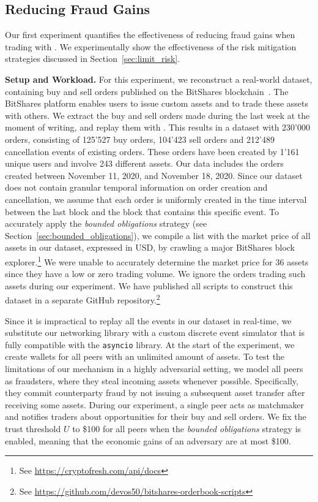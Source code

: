\subsection{Reducing Fraud Gains}
\label{sec:fraud_experiment}
Our first experiment quantifies the effectiveness of reducing fraud gains when trading with \ModelName{}.
We experimentally show the effectiveness of the risk mitigation strategies discussed in Section~\ref{sec:limit_risk}.

\textbf{Setup and Workload.}
For this experiment, we reconstruct a real-world dataset, containing buy and sell orders published on the BitShares blockchain~\cite{schuh2015bitshares}.
The BitShares platform enables users to issue custom assets and to trade these assets with others.
We extract the buy and sell orders made during the last week at the moment of writing, and replay them with \ModelName{}.
This results in a dataset with 230'000 orders, consisting of 125'527 buy orders, 104'423 sell orders and 212'489 cancellation events of existing orders.
These orders have been created by 1'161 unique users and involve 243 different assets.
Our data includes the orders created between November 11, 2020, and November 18, 2020.
Since our dataset does not contain granular temporal information on order creation and cancellation, we assume that each order is uniformly created in the time interval between the last block and the block that contains this specific event.
To accurately apply the \emph{bounded obligations} strategy (see Section~\ref{sec:bounded_obligations}), we compile a list with the market price of all assets in our dataset, expressed in USD, by crawling a major BitShares block explorer.\footnote{See \url{https://cryptofresh.com/api/docs}}
We were unable to accurately determine the market price for 36 assets since they have a low or zero trading volume.
We ignore the orders trading such assets during our experiment.
We have published all scripts to construct this dataset in a separate GitHub repository.\footnote{See \url{https://github.com/devos50/bitshares-orderbook-scripts}}

Since it is impractical to replay all the events in our dataset in real-time, we substitute our networking library with a custom discrete event simulator that is fully compatible with the \texttt{asyncio} library.
At the start of the experiment, we create wallets for all peers with an unlimited amount of assets.
To test the limitations of our mechanism in a highly adversarial setting, we model all peers as fraudsters, where they steal incoming assets whenever possible.
Specifically, they commit counterparty fraud by not issuing a subsequent asset transfer after receiving some assets.
During our experiment, a single peer acts as matchmaker and notifies traders about opportunities for their buy and sell orders.
We fix the trust threshold $ U $ to \$100 for all peers when the \emph{bounded obligations} strategy is enabled, meaning that the economic gains of an adversary are at most \$100.

